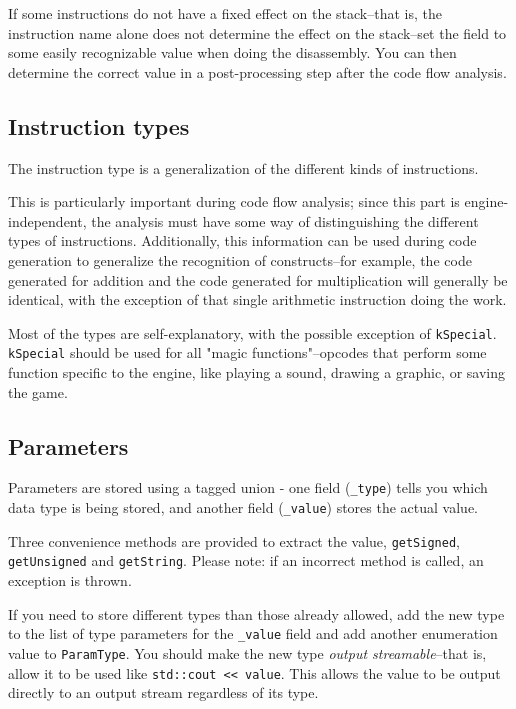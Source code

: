 If some instructions do not have a fixed effect on the stack--that is, the instruction name alone does not determine the effect on the stack--set the field to some easily recognizable value when doing the disassembly. You can then determine the correct value in a post-processing step after the code flow analysis.

\subsection{Instruction types}
\label{sec:insttype}
The instruction type is a generalization of the different kinds of instructions.

This is particularly important during code flow analysis; since this part is engine-independent, the analysis must have some way of distinguishing the different types of instructions. Additionally, this information can be used during code generation to generalize the recognition of constructs--for example, the code generated for addition and the code generated for multiplication will generally be identical, with the exception of that single arithmetic instruction doing the work.

Most of the types are self-explanatory, with the possible exception of \verb+kSpecial+. \verb+kSpecial+ should be used for all "magic functions"--opcodes that perform some function specific to the engine, like playing a sound, drawing a graphic, or saving the game.

\subsection{Parameters}
\label{sec:parameter}
Parameters are stored using a tagged union - one field (\verb+_type+) tells you which data type is being stored, and another field (\verb+_value+) stores the actual value.

Three convenience methods are provided to extract the value, \verb+getSigned+, \verb+getUnsigned+ and \verb+getString+. Please note: if an incorrect method is called, an exception is thrown.

If you need to store different types than those already allowed, add the new type to the list of type parameters for the \verb+_value+ field and add another enumeration value to \verb+ParamType+. You should make the new type \emph{output streamable}--that is, allow it to be used like \verb+std::cout << value+. This allows the value to be output directly to an output stream regardless of its type.

